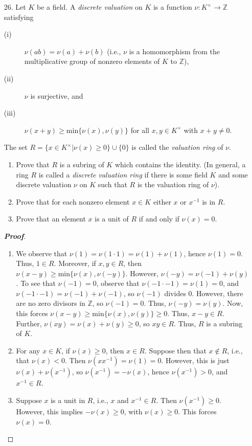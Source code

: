 \documentclass[12pt,leqno]{book}
\theoremstyle{definition}
\newcommand{\Z}{\mathbb{Z}}
\newenvironment{Proof}{\begin{proof}[\textnormal{\textbf{Proof}}]}{\end{proof}}
\begin{document}
\begin{enumerate}
\begin{Proof}
\end{Proof}

 \item [26.] Let $K$ be a field. A \textit{discrete valuation} on $K$ is a function $\nu:K^{\times}\to\Z$ satisfying 
\begin{description}
 \item [(i)] $\nu(ab)=\nu(a)+\nu(b)$ (i.e., $\nu$ is a homomorphism from the multiplicative group of nonzero elements of $K$ to $\Z$),
 \item [(ii)] $\nu$ is surjective, and
 \item [(iii)] $\nu(x+y)\geq\text{min}\{\nu(x),\nu(y)\}$ for all $x,y\in K^{\times}$ with $x+y\not=0$.
\end{description}
The set $R=\{x\in K^{\times}|\nu(x)\geq0\}\cup\{0\}$ is called the \textit{valuation ring} of $\nu$.
  \begin{enumerate}
   \item Prove that $R$ is a subring of $K$ which contains the identity. (In general, a ring $R$ is called a \textit{discrete valuation ring} if there is some field $K$ and some discrete valuation $\nu$ on $K$ such that $R$ is the valuation ring of $\nu$).
   \item Prove that for each nonzero element $x\in K$ either $x$ or $x^{-1}$ is in $R$.
   \item Prove that an element $x$ is a unit of $R$ if and only if $\nu(x)=0$.
  \end{enumerate}

\begin{Proof}
 \begin{enumerate}
  \item We observe that $\nu(1)=\nu(1\cdot1)=\nu(1)+\nu(1)$, hence $\nu(1)=0$. Thus, $1\in R$. Moreover, if $x,y\in R$, then $\nu(x-y)\geq\text{min}\{\nu(x),\nu(-y)\}$. However, $\nu(-y)=\nu(-1)+\nu(y)$. To see that $\nu(-1)=0$, observe that $\nu(-1\cdot-1)=\nu(1)=0$, and $\nu(-1\cdot-1)=\nu(-1)+\nu(-1)$, so $\nu(-1)$ divides 0. However, there are no zero divisors in $\Z$, so $\nu(-1)=0$. Thus, $\nu(-y)=\nu(y)$. Now, this forces $\nu(x-y)\geq\text{min}\{\nu(x),\nu(y)\}\geq0$. Thus, $x-y\in R$. Further, $\nu(xy)=\nu(x)+\nu(y)\geq0$, so $xy\in R$. Thus, $R$ is a subring of $K$.
  \item For any $x\in K$, if $\nu(x)\geq0$, then $x\in R$. Suppose then that $x\notin R$, i.e., that $\nu(x)<0$. Then $\nu(xx^{-1})=\nu(1)=0$. However, this is just $\nu(x)+\nu(x^{-1})$, so $\nu(x^{-1})=-\nu(x)$, hence $\nu(x^{-1})>0$, and $x^{-1}\in R$.
  \item Suppose $x$ is a unit in $R$, i.e., $x$ and $x^{-1}\in R$. Then $\nu(x^{-1})\geq0$. However, this implies $-\nu(x)\geq0$, with $\nu(x)\geq0$. This forces $\nu(x)=0$.
 \end{enumerate}

\end{Proof}

\end{enumerate}
\end{document}
